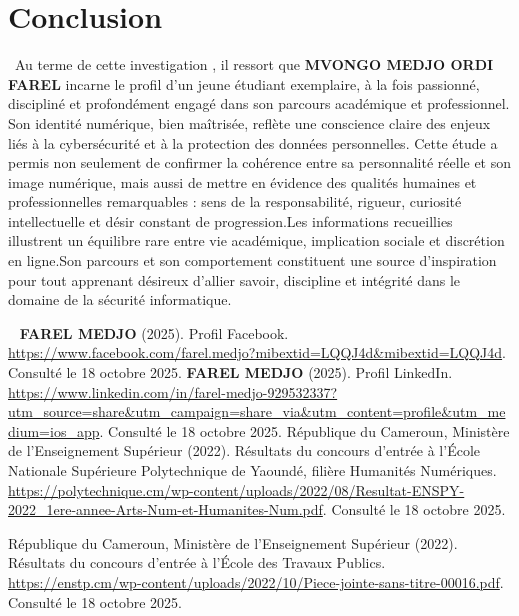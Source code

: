 \documentclass[12pt,a4paper]{report}
\begin{document}
\section*{Conclusion}
\label{sec:conclusion}\
Au terme de cette investigation , il ressort que \textbf{MVONGO MEDJO ORDI FAREL} incarne le profil d’un jeune étudiant exemplaire, à la fois passionné, discipliné et profondément engagé dans son parcours académique et professionnel. Son identité numérique, bien maîtrisée, reflète une conscience claire des enjeux liés à la cybersécurité et à la protection des données personnelles.
Cette étude a permis non seulement de confirmer la cohérence entre sa personnalité réelle et son image numérique, mais aussi de mettre en évidence des qualités humaines et professionnelles remarquables : sens de la responsabilité, rigueur, curiosité intellectuelle et désir constant de progression.Les informations recueillies illustrent un équilibre rare entre vie académique, implication sociale et discrétion en ligne.Son parcours et son comportement constituent une source d’inspiration pour tout apprenant désireux d’allier savoir, discipline et intégrité dans le domaine de la sécurité informatique.
\begin{thebibliography}{99}\label{sec:ref}\
\bibitem{facebook}
\textbf{FAREL MEDJO} (2025). Profil Facebook. \url{https://www.facebook.com/farel.medjo?mibextid=LQQJ4d&mibextid=LQQJ4d}. Consulté le 18 octobre 2025.
\bibitem{linkedin}
\textbf{FAREL MEDJO} (2025). Profil LinkedIn. \url{https://www.linkedin.com/in/farel-medjo-929532337?utm_source=share&utm_campaign=share_via&utm_content=profile&utm_medium=ios_app}. Consulté le 18 octobre 2025.
\bibitem{enspy2022}
République du Cameroun, Ministère de l'Enseignement Supérieur (2022). Résultats du concours d'entrée à l'École Nationale Supérieure Polytechnique de Yaoundé, filière Humanités Numériques. \url{https://polytechnique.cm/wp-content/uploads/2022/08/Resultat-ENSPY-2022_1ere-annee-Arts-Num-et-Humanites-Num.pdf}. Consulté le 18 octobre 2025.

\bibitem{etp2022}
République du Cameroun, Ministère de l'Enseignement Supérieur (2022). Résultats du concours d'entrée à l'École des Travaux Publics. \url{https://enstp.cm/wp-content/uploads/2022/10/Piece-jointe-sans-titre-00016.pdf}. Consulté le 18 octobre 2025.

\end{thebibliography}
\end{document}
